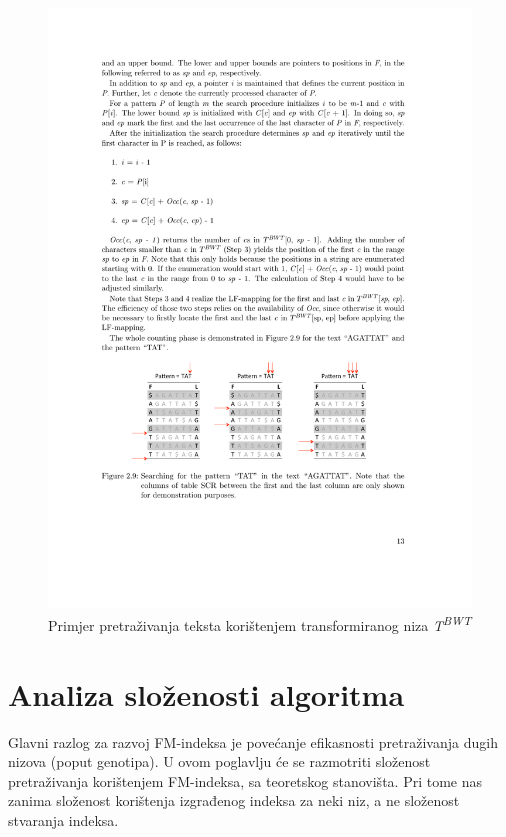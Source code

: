 \documentclass[times, utf8, seminar, numeric]{fer}
\begin{document}
\begin{figure}[!htb]
\centering
\includegraphics{fig/sa_search.pdf}
\caption{Primjer pretraživanja teksta korištenjem transformiranog niza \textit{T\textsuperscript{BWT}}}
\label{fig:sa_search}
\end{figure}

\section{Analiza složenosti algoritma}

Glavni razlog za razvoj FM-indeksa je povećanje efikasnosti pretraživanja dugih nizova
(poput genotipa). U ovom poglavlju će se razmotriti složenost pretraživanja korištenjem
FM-indeksa, sa teoretskog stanovišta. Pri tome nas zanima složenost korištenja
izgrađenog indeksa za neki niz, a ne složenost stvaranja indeksa.
\end{document}
